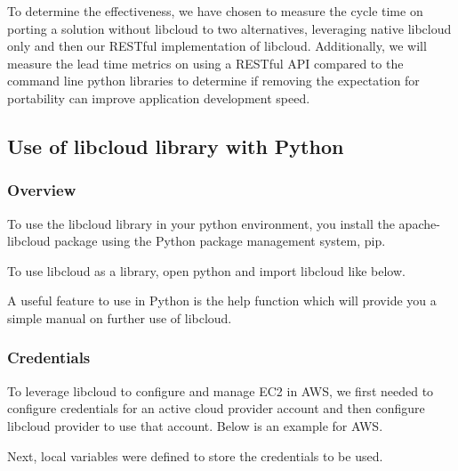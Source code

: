To determine the effectiveness, we have chosen to measure the cycle time on porting a 
solution without libcloud to two alternatives, leveraging native libcloud only and then 
our RESTful implementation of libcloud. Additionally, we will measure the lead time 
metrics on using a RESTful API compared to the command line python libraries to determine
if removing the expectation for portability can improve application development speed.

\subsection{Use of libcloud library with Python}

\subsubsection{Overview}

To use the libcloud library in your python environment, you install the apache-libcloud 
package using the Python package management system, pip.


To use libcloud as a library, open python and import libcloud like below.



A useful feature to use in Python is the help function which will provide you a simple 
manual on further use of libcloud.



\subsubsection{Credentials}

To leverage libcloud to configure and manage EC2 in AWS, we first needed to configure 
credentials for an active cloud provider account and then configure libcloud provider 
to use that account. Below is an example for AWS.




Next, local variables were defined to store the credentials to be used.

